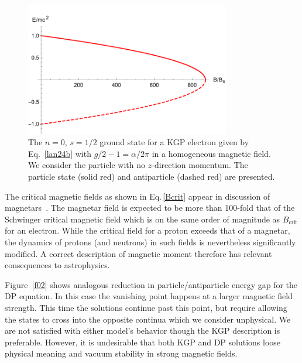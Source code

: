 \begin{figure}
 \centering
 \includegraphics[clip, trim=0.0cm 0.0cm 0.0cm 0.5cm,width=0.8\textwidth]{plots/chap02moment/lanplot01.pdf}
 \caption[]{The $n=0$, $s=1/2$ ground state for a KGP electron given by Eq.~\eqref{lan24b} with $g/2-1=\alpha/2\pi$ in a homogeneous magnetic field. We consider the particle with no $z$-direction momentum. The particle state (solid red) and antiparticle (dashed red) are presented.}
 \label{f01}
\end{figure}

The critical magnetic fields as shown in Eq.\,\eqref{Bcrit} appear in discussion of magnetars~\cite{Kaspi:2017fwg}. The magnetar field is expected to be more than 100-fold that of the Schwinger critical magnetic field which is on the same order of magnitude as $B_\textrm{crit}$ for an electron. While the critical field for a proton exceeds that of a magnetar, the dynamics of protons (and neutrons) in such fields is nevertheless significantly modified. A correct description of magnetic moment therefore has relevant consequences to astrophysics. 

Figure~\ref{f02} shows analogous reduction in particle/anti\-particle energy gap for the DP equation. In this case the vanishing point happens at a larger magnetic field strength. This time the solutions continue past this point, but require allowing the states to cross into the opposite continua which we consider unphysical. We are not satisfied with either model\rq s behavior though the KGP description is preferable. However, it is undesirable that both KGP and DP solutions loose physical meaning and vacuum stability in strong magnetic fields.

